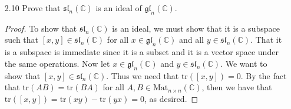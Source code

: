 \documentclass[12pt]{article}
\theoremstyle{definition}
\theoremstyle{definition}
\begin{document}
\begin{enumerate}
\begin{proof}
                $\mathfrak{sl}_{2}(K)$ is simple and consider the following basis:
                \begin{align*}
                    x=\begin{pmatrix}0&1\\0&0\end{pmatrix},& &y=\begin{pmatrix}
                    0&0\\1&0\end{pmatrix},& &h=\begin{pmatrix}1&0\\0&-1\end{pmatrix}.
                \end{align*}
                We have the following commutation relations: 
                \begin{align*}
                    [x, y]=h,& &[x, h]=-2x,& &[y, h]=2y.
                \end{align*}
                Now suppose that $I$ is a nonempty ideal of $\mathfrak{sl}_2(K)$. 
                Then since the latter was assumed to be simple, it follows 
                that $I=\mathfrak{sl}_2(K)$. However, if $K$ had characteristic 2, 
                then this would imply that $[x, h]=0$ and $[y, h]=0$, rendering 
                $I$ one-dimensional which is a contradiction. Hence, the 
                characteristic is not two.
            \end{proof}
        \item[2.10] Prove that $\mathfrak{sl}_n(\mathbb{C})$ is an ideal of $\mathfrak{gl}_n(\mathbb{C})$.
            \begin{proof}
                To show that $\mathfrak{sl}_n(\mathbb{C})$ is an ideal, 
                we must show that it is a subspace such that $[x, y]\in\mathfrak{sl}_n(\mathbb{C})$ 
                for all $x\in\mathfrak{gl}_n(\mathbb{C})$ and all 
                $y\in\mathfrak{sl}_n(\mathbb{C})$. That it is a subspace is 
                immediate since it is a subset and it is a vector space under 
                the same operations. Now let $x\in\mathfrak{gl}_n(\mathbb{C})$ 
                and $y\in\mathfrak{sl}_n(\mathbb{C})$. We want to show that 
                $[x, y]\in\mathfrak{sl}_n(\mathbb{C})$. Thus we need that 
                $\text{tr}([x, y])=0$. By the fact that $\text{tr}(AB)=\text{tr}(BA)$ 
                for all $A, B\in\text{Mat}_{n\times n}(\mathbb{C})$, then we 
                have that $\text{tr}([x, y])=\text{tr}(xy)-\text{tr}(yx)=0$, as desired. 

\end{proof}
\end{enumerate}
\end{document}
